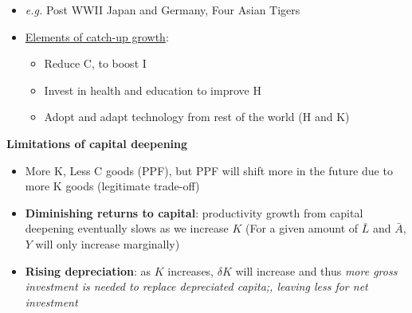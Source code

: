 \documentclass{article}
\newcommand{\eg}[0]{\textit{e.g. }}
\begin{document}
\begin{multicols}{2}
\begin{itemize}
	\item \eg Post WWII Japan and Germany, Four Asian Tigers
	\item \underline{Elements of catch-up growth}:
	\begin{itemize}
		\item Reduce C, to boost I
		\item Invest in health and education to improve H
		\item Adopt and adapt technology from rest of the world (H and K)
	\end{itemize}
\end{itemize}
\textbf{Limitations of capital deepening}
\begin{itemize}
	\item More K, Less C goods (PPF), but PPF will shift more in the future due to more K goods (legitimate trade-off)
	\item \textbf{Diminishing returns to capital}: productivity growth from capital deepening eventually slows as we increase $K$ (For a given amount of $\bar{L}$ and $\bar{A}$, $Y$ will only increase marginally)
	\item \textbf{Rising depreciation}: as $K$ increases, $\delta K $ will increase and thus \textit{more gross investment is needed to replace depreciated capita;, leaving less for net investment}
\end{itemize}

\end{multicols}
\end{document}
